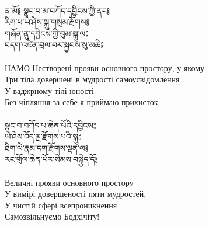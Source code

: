 
\normalsize
\ru
{}
\\
\ti ན་མོ༔ སྣང་བ་མ་བཀོད་དབྱིངས་ཀྱི་ནང༔ \\
རིག་པ་ཡེ་ཤེས་སྐུ་གསུམ་རྫོགས༔ \\
གཞོན་ནུ་དབྱིངས་ཀྱི་བུམ་སྐུ་ལ༔\\
བདག་འཛིན་བྲལ་བར་སྐྱབས་སུ་མཆི༔\\
\\
\ru НАМО   Нестворені прояви основного простору, у якому\\
Три тіла довершені в мудрості самоусвідомлення\\
У ваджрному тілі юності\\
Без чіпляння за себе я приймаю прихисток\\
\\
\ti སྣང་བ་བཀོད་པ་ཆེན་པོའི་དབྱིངས༔ \\
ཡེ་ཤེས་འོད་ལྔ་རྫོགས་པའི་སྐུ༔ \\
ཐིག་ལེ་རྣམ་དག་རྫོགས་ལྡན་ལ༔ \\
རང་གྲོལ་ཆེན་པོར་སེམས་བསྐྱེད་དོ༔ \\
\\
\ru Величні прояви основного простору\\
У вимірі довершеності пяти мудростей,\\
У чистій сфері всепроникнення\\
Самозвільнуємо Бодхічіту!\\

\normalsize

